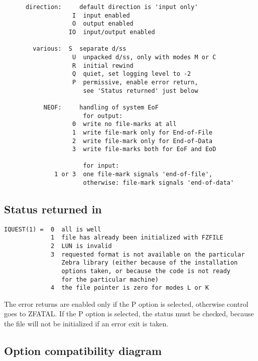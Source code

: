 \begin{verbatim}
      direction:     default direction is 'input only'
                   I  input enabled
                   O  output enabled
                  IO  input/output enabled

        various:  S  separate d/ss
                   U  unpacked d/ss, only with modes M or C
                   R  initial rewind
                   Q  quiet, set logging level to -2
                   P  permissive, enable error return,
                      see 'Status returned' just below

           NEOF:     handling of system EoF
                      for output:
                   0  write no file-marks at all
                   1  write file-mark only for End-of-File
                   2  write file-mark only for End-of-Data
                   3  write file-marks both for EoF and EoD

                      for input:
              1 or 3  one file-mark signals 'end-of-file',
                      otherwise: file-mark signals 'end-of-data'
\end{verbatim}

\subsection*{Status returned in }

\begin{verbatim}
IQUEST(1) =  0  all is well
             1  file has already been initialized with FZFILE
             2  LUN is invalid
             3  requested format is not available on the particular
                Zebra library (either because of the installation
                options taken, or because the code is not ready
                for the particular machine)
             4  the file pointer is zero for modes L or K
\end{verbatim}

The error returns are enabled only if the P option is selected,
otherwise control goes to ZFATAL. If the P option is selected,
the status must be checked, because the file will not be initialized
if an error exit is taken.

\subsection*{Option compatibility diagram}

